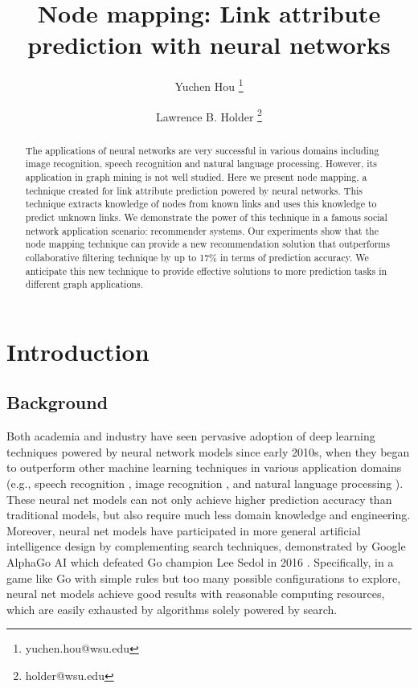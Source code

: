 \documentclass[twocolumn]{article}
\begin{document}
\lstset{language=python, tabsize=4}
\title{Node mapping: Link attribute prediction with neural networks}
\author[1]{Yuchen Hou \thanks{yuchen.hou@wsu.edu}}
\author[1]{Lawrence B. Holder \thanks{holder@wsu.edu}}
\maketitle

\begin{abstract}
	The applications of neural networks are very successful in various domains 
	including image recognition, speech recognition and natural language 
	processing.
	However, its application in graph mining is not well studied.
	Here we present node mapping, a technique created for link attribute 
	prediction powered by neural networks.
	This technique extracts knowledge of nodes from known links and uses this 
	knowledge to predict unknown links.
	We demonstrate the power of this technique in a famous social network 
	application scenario: recommender systems.
	Our experiments show that the node mapping technique can provide a new
	recommendation solution that outperforms collaborative filtering 
	technique by up to 17\% in terms of prediction accuracy.
	We anticipate this new technique to provide effective solutions to more 
	prediction tasks in different graph applications.
\end{abstract}

\section{Introduction}

\subsection{Background}
Both academia and industry have seen pervasive adoption of deep learning 
techniques powered by neural network models since early 2010s,
when they began to outperform other machine learning techniques in various 
application domains (e.g., speech recognition \cite{hannun2014deep}, image 
recognition \cite{simonyan2014very}, and natural language processing 
\cite{yao2013recurrent}).
These neural net models can not only achieve higher prediction accuracy than 
traditional models,
but also require much less domain knowledge and engineering.
Moreover, neural net models have participated in more general artificial 
intelligence design by complementing search techniques, 
demonstrated by Google AlphaGo AI which defeated Go champion Lee Sedol in 
2016 \cite{silver2016mastering}.
Specifically, in a game like Go with simple rules but too many possible 
configurations to explore,
neural net models achieve good results with reasonable computing resources, 
which are easily exhausted by algorithms solely powered by search.
\end{document}
